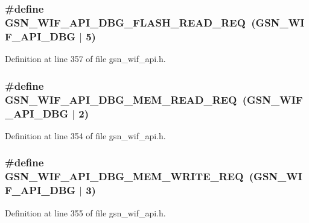 \hypertarget{a00606_a0aaa70b34aba81a71b8bde80f389cbd0}{
\subsubsection[{GSN\_\-WIF\_\-API\_\-DBG\_\-FLASH\_\-READ\_\-REQ}]{\setlength{\rightskip}{0pt plus 5cm}\#define GSN\_\-WIF\_\-API\_\-DBG\_\-FLASH\_\-READ\_\-REQ~(GSN\_\-WIF\_\-API\_\-DBG $|$ 5)}}
\label{a00606_a0aaa70b34aba81a71b8bde80f389cbd0}


Definition at line 357 of file gsn\_\-wif\_\-api.h.

\hypertarget{a00606_a6bcd7953e56bfbba85dd70749c2bdf53}{
\subsubsection[{GSN\_\-WIF\_\-API\_\-DBG\_\-MEM\_\-READ\_\-REQ}]{\setlength{\rightskip}{0pt plus 5cm}\#define GSN\_\-WIF\_\-API\_\-DBG\_\-MEM\_\-READ\_\-REQ~(GSN\_\-WIF\_\-API\_\-DBG $|$ 2)}}
\label{a00606_a6bcd7953e56bfbba85dd70749c2bdf53}


Definition at line 354 of file gsn\_\-wif\_\-api.h.

\hypertarget{a00606_ac5cf169380b5ecfbecccd7485cc52417}{
\subsubsection[{GSN\_\-WIF\_\-API\_\-DBG\_\-MEM\_\-WRITE\_\-REQ}]{\setlength{\rightskip}{0pt plus 5cm}\#define GSN\_\-WIF\_\-API\_\-DBG\_\-MEM\_\-WRITE\_\-REQ~(GSN\_\-WIF\_\-API\_\-DBG $|$ 3)}}
\label{a00606_ac5cf169380b5ecfbecccd7485cc52417}


Definition at line 355 of file gsn\_\-wif\_\-api.h.

